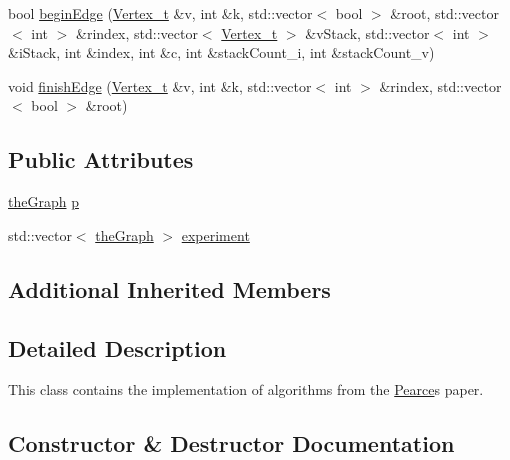 \begin{DoxyCompactItemize}
\item 
bool \hyperlink{class_pearce_a6d6c641f1815e11536554077ed18c10e}{begin\+Edge} (\hyperlink{class_graph_component_ae67114a6ce5a001dc35e1996e1b45aa0}{Vertex\+\_\+t} \&v, int \&k, std\+::vector$<$ bool $>$ \&root, std\+::vector$<$ int $>$ \&rindex, std\+::vector$<$ \hyperlink{class_graph_component_ae67114a6ce5a001dc35e1996e1b45aa0}{Vertex\+\_\+t} $>$ \&v\+Stack, std\+::vector$<$ int $>$ \&i\+Stack, int \&index, int \&c, int \&stack\+Count\+\_\+i, int \&stack\+Count\+\_\+v)
\item 
void \hyperlink{class_pearce_a4ed2b91ac3246895ec5d70fe3530690e}{finish\+Edge} (\hyperlink{class_graph_component_ae67114a6ce5a001dc35e1996e1b45aa0}{Vertex\+\_\+t} \&v, int \&k, std\+::vector$<$ int $>$ \&rindex, std\+::vector$<$ bool $>$ \&root)
\end{DoxyCompactItemize}
\subsection*{Public Attributes}
\begin{DoxyCompactItemize}
\item 
\hyperlink{class_graph_component_a982e0748a6e1b8dc74986f5f8b3dca5c}{the\+Graph} \hyperlink{class_pearce_a2320928312fd97f6bcb1f16684f79a03}{p}
\item 
std\+::vector$<$ \hyperlink{class_graph_component_a982e0748a6e1b8dc74986f5f8b3dca5c}{the\+Graph} $>$ \hyperlink{class_pearce_ad33eb33876fe817143afb84583934313}{experiment}
\end{DoxyCompactItemize}
\subsection*{Additional Inherited Members}


\subsection{Detailed Description}
This class contains the implementation of algorithms from the \hyperlink{class_pearce}{Pearce}\textquotesingle{}s paper. 

\subsection{Constructor \& Destructor Documentation}
\mbox{\label{class_pearce_a4ad24a40c64e8f3481dd0dbbcb8d2bcb}} 
